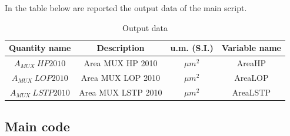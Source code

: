 In the table below are reported the output data of the main script.

\begin{table}[h]
	\begin{center}
		\begin{tabular}{|c|c|c|c|} \hline
			\textbf{Quantity name} & \textbf{Description} & \textbf{u.m. (S.I.)} & \textbf{Variable name} \\ \hline
			$A_{MUX} \ HP2010$ &Area MUX HP 2010 & $\mu m^2$ & AreaHP \\
			$A_{MUX} \ LOP2010$ &Area MUX LOP 2010 & $\mu m^2$ & AreaLOP \\
			$A_{MUX} \ LSTP2010$ &Area MUX LSTP 2010 & $\mu m^2$ & AreaLSTP \\  \hline
		\end{tabular}
	\end{center}
	\caption{Output data}
	\label{tabna}
\end{table}

\subsection{Main code}
